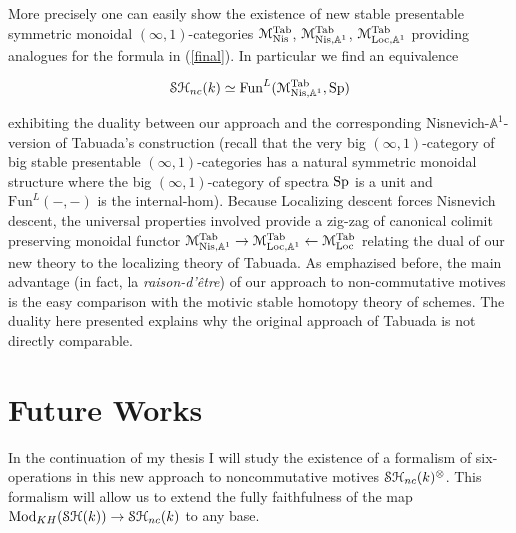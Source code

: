 \begin{refsection}
More precisely  one can easily show the existence of new stable presentable symmetric monoidal  $(\infty,1)$-categories $\mathcal{M}^\mathrm{Tab}_\mathrm{Nis}$, $\mathcal{M}^\mathrm{Tab}_{\mathrm{Nis}, \mathbb{A}^1}$, $\mathcal{M}^\mathrm{Tab}_{\mathrm{Loc}, \mathbb{A}^1}$ providing analogues for the formula in (\ref{final}). In particular we find an equivalence

\begin{equation}
 \mathcal{S}\mathcal{H}_{nc}(k)\simeq \mathrm{Fun}^{L}(\mathcal{M}^\mathrm{Tab}_{\mathrm{Nis}, \mathbb{A}^1}, \mathrm{Sp})
\end{equation}

\noindent exhibiting the duality between our approach and the corresponding Nisnevich-$\mathbb{A}^1$-version of Tabuada's construction (recall that the very big $(\infty,1)$-category of big stable presentable $(\infty,1)$-categories has a natural symmetric monoidal structure \cite[6.3.2.10, 6.3.2.18 and 6.3.1.17]{ha} where the big $(\infty,1)$-category of spectra $\mathrm{Sp}$ is a unit and $\mathrm{Fun}^{L}(-,-)$ is the internal-hom).  Because Localizing descent forces Nisnevich descent, the universal properties involved provide a zig-zag of canonical colimit preserving monoidal functor $\mathcal{M}^\mathrm{Tab}_{\mathrm{Nis},\mathbb{A}^1}\rightarrow  \mathcal{M}^\mathrm{Tab}_{\mathrm{Loc}, \mathbb{A}^1}\leftarrow \mathcal{M}^\mathrm{Tab}_\mathrm{Loc}$ relating the dual of our new theory to the localizing theory of Tabuada. As emphazised before, the main advantage (in fact, la \emph{raison-d'\^etre}) of our approach to non-commutative motives is the easy comparison with the motivic stable homotopy theory of schemes. The duality here presented explains why the original approach of Tabuada is not directly comparable.


\section{Future Works}

In the continuation of my thesis I will study the existence of a formalism of six-operations in this new approach to noncommutative motives $\mathcal{S}\mathcal{H}_{nc}(k)^{\otimes}$. This formalism will allow us to extend the fully faithfulness of the map $\mathrm{Mod}_{KH}(\mathcal{S}\mathcal{H}(k))\to \mathcal{S}\mathcal{H}_{nc}(k)$ to any base.



\end{refsection}
